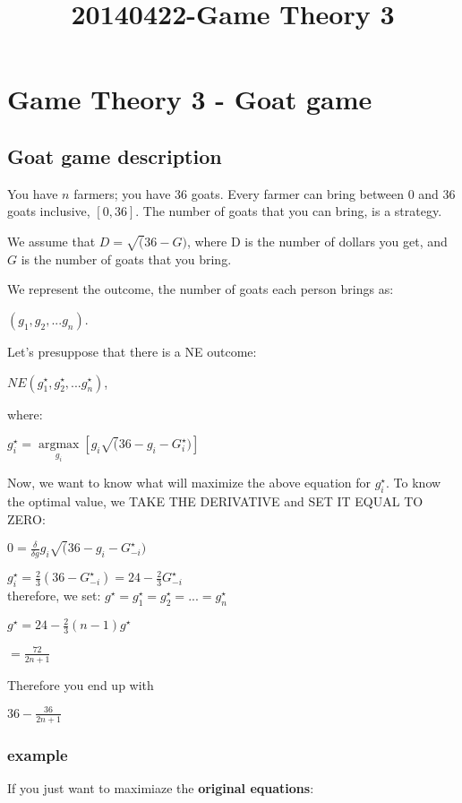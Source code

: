 \documentclass[12pt]{article}
\begin{document}

\title{20140422-Game Theory 3}

\section{Game Theory 3 - Goat game}

\subsection{Goat game description}You have $n$ farmers; you have $36$ goats.  Every farmer can bring between 0 and 36 goats inclusive, $[0, 36]$. The number of goats that you can bring, is a strategy. 

We assume that $D = \sqrt(36-G)$, where D is the number of dollars you get, and $G$ is the number of goats that you bring. 

We represent the outcome, the number of goats each person brings as:

$(g_1, g_2, ... g_n)$.

Let's presuppose that there is a NE outcome:

$NE (g_1^\star, g_2^\star, ... g_n^\star)$, 

where:

$g_i^\star = \underset{g_i}{\operatorname{argmax}} [g_i \sqrt(36-g_i-G_i^\star)]$

Now, we want to know what will maximize the above equation for $g_i^\star$. To know the optimal value, we TAKE THE DERIVATIVE and SET IT EQUAL TO ZERO:

$0 = \frac{\delta}{\delta g} g_i \sqrt(36-g_i-G_{-i}^\star)$

$g_i^\star = \frac{2}{3}(36-G_{-i}^\star) = 24-\frac{2}{3} G_{-i}^\star$
\\
therefore, we set:
$g^\star = g_1^\star = g_2^\star = ... = g_n^\star$

$g^\star = 24 - \frac{2}{3} (n-1) g^\star$

$= \frac{72}{2n+1}$

Therefore you end up with 

$36-\frac{36}{2n+1}$

\subsubsection{example}

If you just want to maximiaze the \textbf{original equations}: 
\end{document}
